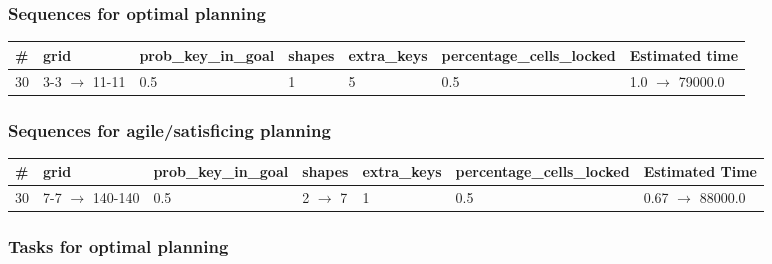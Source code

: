 \documentclass{article}
\begin{document}
                            \subsubsection*{Sequences for optimal planning}

                            \begin{center}
                            \begin{tabular}{@{}l|l|l|l|l|l|l@{}}
                            \# & grid & prob\_key\_in\_goal & shapes & extra\_keys & percentage\_cells\_locked & Estimated time\\\midrule
                            30&3-3 $\rightarrow$ 11-11&0.5&1&5&0.5&1.0 $\rightarrow$ 79000.0
                            \end{tabular}
                            \end{center}
                    
                         \subsubsection*{Sequences for agile/satisficing planning}

                        \begin{center}
                        \begin{tabular}{@{}l|l|l|l|l|l|l@{}}
                        \# & grid & prob\_key\_in\_goal & shapes & extra\_keys & percentage\_cells\_locked & Estimated Time\\\midrule
                        30&7-7 $\rightarrow$ 140-140&0.5&2 $\rightarrow$ 7&1&0.5&0.67 $\rightarrow$ 88000.0
                        \end{tabular}
                        \end{center}
                    
                                \subsubsection*{Tasks for optimal planning}
                                
\end{document}
